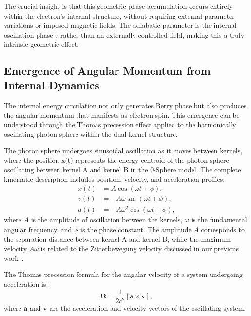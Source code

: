 \documentclass[%
 reprint,
 amsmath,amssymb,
 aps,
]{revtex4-1}
\numberwithin{equation}{section}%
\begin{document}
The crucial insight is that this geometric phase accumulation occurs entirely within the electron's internal structure, without requiring external parameter variations or imposed magnetic fields. The adiabatic parameter is the internal oscillation phase $\tau$ rather than an externally controlled field, making this a truly intrinsic geometric effect.

\subsection{Emergence of Angular Momentum from Internal Dynamics} \label{subsec:angular_momentum}

The internal energy circulation not only generates Berry phase but also produces the angular momentum that manifests as electron spin. This emergence can be understood through the Thomas precession effect applied to the harmonically oscillating photon sphere within the dual-kernel structure.

The photon sphere undergoes sinusoidal oscillation as it moves between kernels, where the position x(t) represents the energy centroid of the photon sphere oscillating between kernel A and kernel B in the 0-Sphere model. The complete kinematic description includes position, velocity, and acceleration profiles:
\begin{align}
x(t) &= A \cos(\omega t + \phi), \label{eq:position_profile}\\
v(t) &= -A\omega \sin(\omega t + \phi), \label{eq:velocity_profile}\\
a(t) &= -A\omega^2 \cos(\omega t + \phi), \label{eq:acceleration_profile}
\end{align}
where $A$ is the amplitude of oscillation between the kernels, $\omega$ is the fundamental angular frequency, and $\phi$ is the phase constant. The amplitude $A$ corresponds to the separation distance between kernel A and kernel B, while the maximum velocity $A\omega$ is related to the Zitterbewegung velocity discussed in our previous work~\cite{hanamura2501.0130}.

The Thomas precession formula for the angular velocity of a system undergoing acceleration is:
\begin{equation}
\boldsymbol{\Omega} = \frac{1}{2c^2}[\mathbf{a} \times \mathbf{v}], \label{eq:thomas_precession}
\end{equation}
where $\mathbf{a}$ and $\mathbf{v}$ are the acceleration and velocity vectors of the oscillating system.
\end{document}
